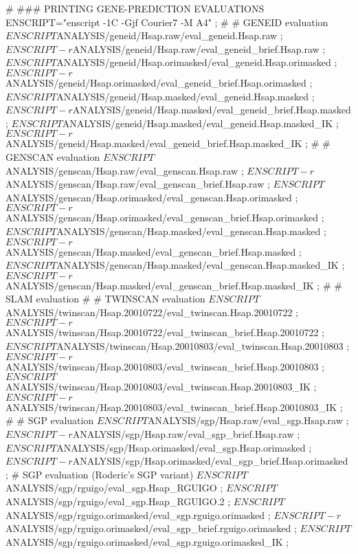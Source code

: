 \documentclass[11pt]{article}
\begin{document}
\nwenddocs{}\plusendmoddef
#
### PRINTING GENE-PREDICTION EVALUATIONS
ENSCRIPT="enscript -1C -Gjf Courier7 -M A4" ;
#
# GENEID evaluation
$ENSCRIPT $ANALYSIS/geneid/Hsap.raw/eval_geneid.Hsap.raw ;
$ENSCRIPT -r $ANALYSIS/geneid/Hsap.raw/eval_geneid_brief.Hsap.raw ;
$ENSCRIPT $ANALYSIS/geneid/Hsap.orimasked/eval_geneid.Hsap.orimasked ;
$ENSCRIPT -r $ANALYSIS/geneid/Hsap.orimasked/eval_geneid_brief.Hsap.orimasked ;
$ENSCRIPT $ANALYSIS/geneid/Hsap.masked/eval_geneid.Hsap.masked ;
$ENSCRIPT -r $ANALYSIS/geneid/Hsap.masked/eval_geneid_brief.Hsap.masked ;
$ENSCRIPT $ANALYSIS/geneid/Hsap.masked/eval_geneid.Hsap.masked_IK ;
$ENSCRIPT -r $ANALYSIS/geneid/Hsap.masked/eval_geneid_brief.Hsap.masked_IK ;
#
# GENSCAN evaluation
$ENSCRIPT $ANALYSIS/genscan/Hsap.raw/eval_genscan.Hsap.raw ;
$ENSCRIPT -r $ANALYSIS/genscan/Hsap.raw/eval_genscan_brief.Hsap.raw ;
$ENSCRIPT $ANALYSIS/genscan/Hsap.orimasked/eval_genscan.Hsap.orimasked ;
$ENSCRIPT -r $ANALYSIS/genscan/Hsap.orimasked/eval_genscan_brief.Hsap.orimasked ;
$ENSCRIPT $ANALYSIS/genscan/Hsap.masked/eval_genscan.Hsap.masked ;
$ENSCRIPT -r $ANALYSIS/genscan/Hsap.masked/eval_genscan_brief.Hsap.masked ;
$ENSCRIPT $ANALYSIS/genscan/Hsap.masked/eval_genscan.Hsap.masked_IK ;
$ENSCRIPT -r $ANALYSIS/genscan/Hsap.masked/eval_genscan_brief.Hsap.masked_IK ;
#
# SLAM evaluation
#
# TWINSCAN evaluation
$ENSCRIPT $ANALYSIS/twinscan/Hsap.20010722/eval_twinscan.Hsap.20010722 ;
$ENSCRIPT -r $ANALYSIS/twinscan/Hsap.20010722/eval_twinscan_brief.Hsap.20010722 ;
$ENSCRIPT $ANALYSIS/twinscan/Hsap.20010803/eval_twinscan.Hsap.20010803 ;
$ENSCRIPT -r $ANALYSIS/twinscan/Hsap.20010803/eval_twinscan_brief.Hsap.20010803 ;
$ENSCRIPT $ANALYSIS/twinscan/Hsap.20010803/eval_twinscan.Hsap.20010803_IK ;
$ENSCRIPT -r $ANALYSIS/twinscan/Hsap.20010803/eval_twinscan_brief.Hsap.20010803_IK ;
#
# SGP evaluation
$ENSCRIPT $ANALYSIS/sgp/Hsap.raw/eval_sgp.Hsap.raw ;
$ENSCRIPT -r $ANALYSIS/sgp/Hsap.raw/eval_sgp_brief.Hsap.raw ;
$ENSCRIPT $ANALYSIS/sgp/Hsap.orimasked/eval_sgp.Hsap.orimasked ;
$ENSCRIPT -r $ANALYSIS/sgp/Hsap.orimasked/eval_sgp_brief.Hsap.orimasked ;
# SGP evaluation (Roderic's SGP variant)
$ENSCRIPT $ANALYSIS/sgp/rguigo/eval_sgp.Hsap_RGUIGO ;
$ENSCRIPT $ANALYSIS/sgp/rguigo/eval_sgp.Hsap_RGUIGO.2 ;
$ENSCRIPT $ANALYSIS/sgp/rguigo.orimasked/eval_sgp.rguigo.orimasked ;
$ENSCRIPT -r $ANALYSIS/sgp/rguigo.orimasked/eval_sgp_brief.rguigo.orimasked ;
$ENSCRIPT $ANALYSIS/sgp/rguigo.orimasked/eval_sgp.rguigo.orimasked_IK ;
\end{document}
